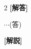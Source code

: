 \documentclass[../../main.tex]{subfiles}
\begin{document}
\setcounter{equation}{0}
\begin{oframed}
  
\end{oframed}
\setlength{\columnseprule}{0.4pt}
\begin{multicols}{2}
  {\bf [解答]}

  $\cdots$(答)

  {\bf [解説]}

  \newpage
\end{multicols}
\end{document}
